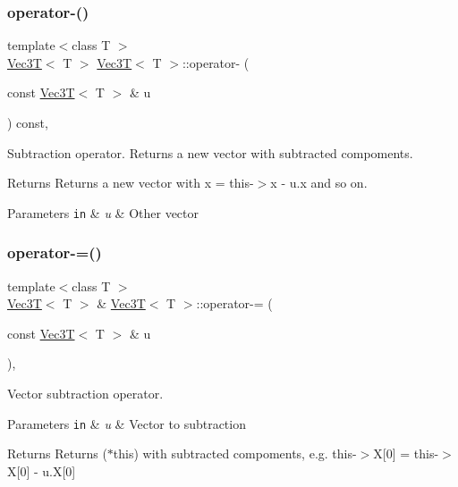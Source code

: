 \subsubsection{\texorpdfstring{operator-\/()}{operator-()}}
{\footnotesize\ttfamily template$<$class T $>$ \\
\hyperlink{classVec3T}{Vec3T}$<$ T $>$ \hyperlink{classVec3T}{Vec3T}$<$ T $>$\+::operator-\/ (\begin{DoxyParamCaption}\item[{const \hyperlink{classVec3T}{Vec3T}$<$ T $>$ \&}]{u }\end{DoxyParamCaption}) const\hspace{0.3cm}{\ttfamily [inline]}, {\ttfamily [noexcept]}}



Subtraction operator. Returns a new vector with subtracted compoments. 

\begin{DoxyReturn}{Returns}
Returns a new vector with x = this-\/$>$x -\/ u.\+x and so on. 
\end{DoxyReturn}

\begin{DoxyParams}[1]{Parameters}
\mbox{\tt in}  & {\em u} & Other vector \\
\hline
\end{DoxyParams}
\mbox{\label{classVec3T_a8a580094450e167248f4ee089027fa40}} 
\subsubsection{\texorpdfstring{operator-\/=()}{operator-=()}}
{\footnotesize\ttfamily template$<$class T $>$ \\
\hyperlink{classVec3T}{Vec3T}$<$ T $>$ \& \hyperlink{classVec3T}{Vec3T}$<$ T $>$\+::operator-\/= (\begin{DoxyParamCaption}\item[{const \hyperlink{classVec3T}{Vec3T}$<$ T $>$ \&}]{u }\end{DoxyParamCaption})\hspace{0.3cm}{\ttfamily [inline]}, {\ttfamily [noexcept]}}



Vector subtraction operator. 


\begin{DoxyParams}[1]{Parameters}
\mbox{\tt in}  & {\em u} & Vector to subtraction \\
\hline
\end{DoxyParams}
\begin{DoxyReturn}{Returns}
Returns ($\ast$this) with subtracted compoments, e.\+g. this-\/$>$X\mbox{[}0\mbox{]} = this-\/$>$X\mbox{[}0\mbox{]} -\/ u.\+X\mbox{[}0\mbox{]} 
\end{DoxyReturn}
\mbox{\label{classVec3T_acc5973c1c82e51c597b47ba39870f528}} 
